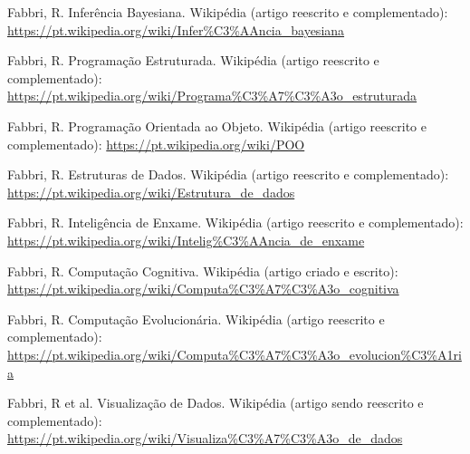 \documentclass[a4paper, 11pt]{article}
\begin{document}
\begin{thebibliography}{99}
  Fabbri, R. Inferência Bayesiana. Wikipédia (artigo reescrito e complementado): \url{https://pt.wikipedia.org/wiki/Infer%C3%AAncia_bayesiana}

  Fabbri, R. Programação Estruturada. Wikipédia (artigo reescrito e complementado): \url{https://pt.wikipedia.org/wiki/Programa%C3%A7%C3%A3o_estruturada}

  Fabbri, R. Programação Orientada ao Objeto. Wikipédia (artigo reescrito e complementado): \url{https://pt.wikipedia.org/wiki/POO}

  Fabbri, R. Estruturas de Dados. Wikipédia (artigo reescrito e complementado): \url{https://pt.wikipedia.org/wiki/Estrutura_de_dados}

  Fabbri, R. Inteligência de Enxame. Wikipédia (artigo reescrito e complementado): \url{https://pt.wikipedia.org/wiki/Intelig%C3%AAncia_de_enxame}

  Fabbri, R. Computação Cognitiva. Wikipédia (artigo criado e escrito): \url{https://pt.wikipedia.org/wiki/Computa%C3%A7%C3%A3o_cognitiva}

  Fabbri, R. Computação Evolucionária. Wikipédia (artigo reescrito e complementado): \url{https://pt.wikipedia.org/wiki/Computa%C3%A7%C3%A3o_evolucion%C3%A1ria}

  Fabbri, R et al. Visualização de Dados. Wikipédia (artigo sendo reescrito e complementado): \url{https://pt.wikipedia.org/wiki/Visualiza%C3%A7%C3%A3o_de_dados}

\end{thebibliography}
\end{document}
